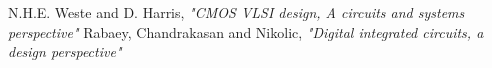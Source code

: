 
\begin{thebibliography}{report\_nand}
 N.H.E. Weste and D. Harris, \emph{"CMOS VLSI design, A circuits and systems perspective"}
 Rabaey, Chandrakasan and Nikolic, \emph{"Digital integrated circuits, a design perspective"}
\end{thebibliography}